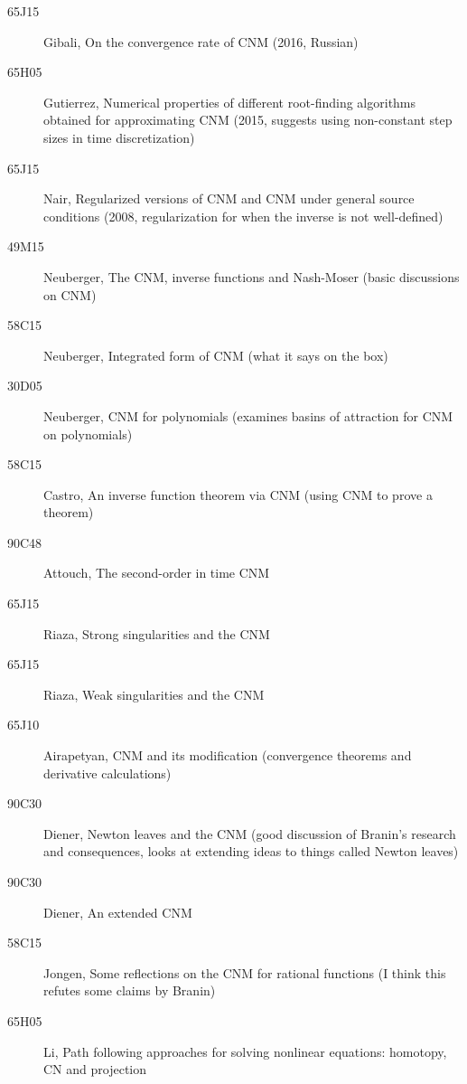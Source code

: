 \documentclass{book}
\begin{document}
\begin{description}
\item[65J15] Gibali, On the convergence rate of CNM (2016, Russian)
\item[65H05] Gutierrez, Numerical properties of different root-finding algorithms obtained for approximating CNM (2015, suggests using non-constant step sizes in time discretization)
\item[65J15] Nair, Regularized versions of CNM and CNM under general source conditions (2008, regularization for when the inverse is not well-defined)
\item[49M15] Neuberger, The CNM, inverse functions and Nash-Moser (basic discussions on CNM)
\item[58C15] Neuberger, Integrated form of CNM (what it says on the box)
\item[30D05] Neuberger, CNM for polynomials (examines basins of attraction for CNM on polynomials)
\item[58C15] Castro, An inverse function theorem via CNM (using CNM to prove a theorem)
\item[90C48] Attouch, The second-order in time CNM
\item[65J15] Riaza, Strong singularities and the CNM
\item[65J15] Riaza, Weak singularities and the CNM
\item[65J10] Airapetyan, CNM and its modification (convergence theorems and derivative calculations)
\item[90C30] Diener, Newton leaves and the CNM (good discussion of Branin's research and consequences, looks at extending ideas to things called Newton leaves)
\item[90C30] Diener, An extended CNM
\item[58C15] Jongen, Some reflections on the CNM for rational functions (I think this refutes some claims by Branin)
\item[65H05] Li, Path following approaches for solving nonlinear equations: homotopy, CN and projection
\end{description}
\end{document}
